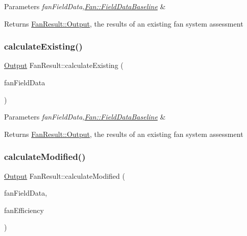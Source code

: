 \begin{DoxyParams}{Parameters}
{\em fan\+Field\+Data,\hyperlink{struct_fan_1_1_field_data_baseline}{Fan\+::\+Field\+Data\+Baseline}} & \\
\hline
\end{DoxyParams}
\begin{DoxyReturn}{Returns}
\hyperlink{struct_fan_result_1_1_output}{Fan\+Result\+::\+Output}, the results of an existing fan system assessment 
\end{DoxyReturn}
\mbox{\label{class_fan_result_abc80cb0fb339969c2497786e479d9484}} 
\subsubsection{\texorpdfstring{calculate\+Existing()}{calculateExisting()}\hspace{0.1cm}{\footnotesize\ttfamily [3/3]}}
{\footnotesize\ttfamily \hyperlink{struct_fan_result_1_1_output}{Output} Fan\+Result\+::calculate\+Existing (\begin{DoxyParamCaption}\item[{\hyperlink{struct_fan_1_1_field_data_baseline}{Fan\+::\+Field\+Data\+Baseline} const \&}]{fan\+Field\+Data }\end{DoxyParamCaption})}


\begin{DoxyParams}{Parameters}
{\em fan\+Field\+Data,\hyperlink{struct_fan_1_1_field_data_baseline}{Fan\+::\+Field\+Data\+Baseline}} & \\
\hline
\end{DoxyParams}
\begin{DoxyReturn}{Returns}
\hyperlink{struct_fan_result_1_1_output}{Fan\+Result\+::\+Output}, the results of an existing fan system assessment 
\end{DoxyReturn}
\mbox{\label{class_fan_result_a64173c80c723487b8a555250d22be459}} 
\subsubsection{\texorpdfstring{calculate\+Modified()}{calculateModified()}\hspace{0.1cm}{\footnotesize\ttfamily [1/3]}}
{\footnotesize\ttfamily \hyperlink{struct_fan_result_1_1_output}{Output} Fan\+Result\+::calculate\+Modified (\begin{DoxyParamCaption}\item[{\hyperlink{struct_fan_1_1_field_data_modified}{Fan\+::\+Field\+Data\+Modified} const \&}]{fan\+Field\+Data,  }\item[{double}]{fan\+Efficiency }\end{DoxyParamCaption})}


